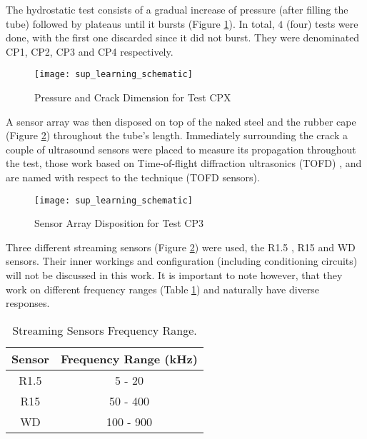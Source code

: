 
The hydrostatic test consists of a gradual increase of pressure (after filling the tube) followed by plateaus until it bursts (Figure \ref{fig:pressure_time}). In total, $4$ (four) tests were done, with the first one discarded since it did not burst. They were denominated CP1, CP2, CP3 and CP4 respectively.

\begin{figure}[H]
	\centering
	\texttt{[image: sup\_learning\_schematic]}
	\caption{Pressure and Crack Dimension for Test CPX}
	\label{fig:pressure_time}
\end{figure}

A sensor array was then disposed on top of the naked steel and the rubber cape (Figure \ref{fig:sensor_disposition}) throughout the tube's length. Immediately surrounding the crack a couple of ultrasound sensors were placed to measure its propagation throughout the test, those work based on Time-of-flight diffraction ultrasonics (TOFD) \cite{charlesworthEngineeringApplicationsUltrasonic2001}, \cite{silkPotentialScatteredDiffracted1975} and are named with respect to the technique (TOFD sensors).


\begin{figure}[H]
	\centering
	\texttt{[image: sup\_learning\_schematic]}
	\caption{Sensor Array Disposition for Test CP3}
	\label{fig:sensor_disposition}
\end{figure}

Three different streaming sensors (Figure \ref{fig:sensor_disposition}) were used, the R1.5 \cite{physicalacousticsR1520KHz}, R15\cite{physicalacousticsR15IAST150KHz} and WD \cite{physicalacousticsWD100900KHz} sensors. Their inner workings and configuration (including conditioning circuits) will not be discussed in this work. It is important to note however, that they work on different frequency ranges (Table \ref{tab:sensor_freq}) and naturally have diverse responses.

\begin{table}[H] \label{tab:sensor_freq}
	\centering
	\caption{Streaming Sensors Frequency Range.}
	\begin{tabular}{cc}
		\hline
		Sensor & Frequency Range (kHz) \\ \hline
		R1.5   & 5 - 20                \\
		R15    & 50 - 400              \\
		WD     & 100 - 900             \\ \hline
	\end{tabular}
\end{table}

